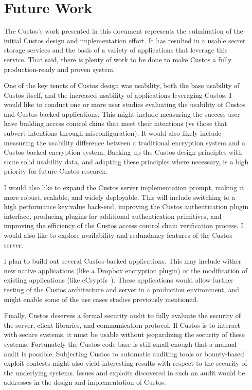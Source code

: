 \section{Future Work}

The Custos's work presented in this document represents the
culmination of the initial Custos design and implementation effort. It
has resulted in a usable secret storage services and the basis of a
variety of applications that leverage this service. That said, there
is plenty of work to be done to make Custos a fully production-ready
and proven system.

One of the key tenets of Custos design was usability, both the base
usability of Custos itself, and the increased usability of
applications leveraging Custos. I would like to conduct one or more
user studies evaluating the usability of Custos and Custos backed
applications. This might include measuring the success user have
building access control chins that meet their intentions (vs those
that subvert intentions through misconfiguration). It would also
likely include measuring the usability difference between a
traditional encryption system and a Custos-backed encryption
system. Backing up the Custos design principles with some solid
usability data, and adapting these principles where necessary, is a
high priority for future Custos research.

I would also like to expand the Custos server implementation prompt,
making it more robust, scalable, and widely deployable. This will
include switching to a high performance key:value back-end, improving
the Custos authentication plugin interface, producing plugins for
additional authentication primitives, and improving the efficiency of
the Custos access control chain verification process. I would also
like to explore availability and redundancy features of the Custos
server.

I plan to build out several Custos-backed applications. This may
include wither new native applications (like a Dropbox\cite{dropbox}
encryption plugin) or the modification of existing applications (like
eCryptfs~\cite{eCryptfs}). These applications would allow further
testing of the Custos architecture and server in a production
environment, and might enable some of the use cases studies previously
mentioned.

Finally, Custos deserves a formal security audit to fully evaluate the
security of the server, client libraries, and communication
protocol. If Custos is to interact with secure systems, it must be
usable without jeopardizing the security of these systems. Fortunately
the Custos code base is still small enough that a manual audit is
possible. Subjecting Custos to automatic auditing tools or
bounty-based exploit contests might also yield interesting results
with respect to the security of the underlying systems. Issues and
exploits discovered in such an audit would be addresses in the design
and implementation of Custos.

